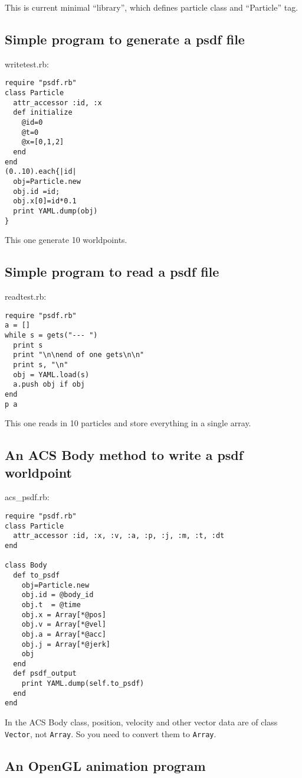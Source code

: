 \documentclass[12pt]{article}
\begin{document}
This is current minimal ``library'', which defines particle class and
``Particle'' tag.

\subsection{Simple program to generate a psdf file}

writetest.rb:
\begin{verbatim}
require "psdf.rb"
class Particle
  attr_accessor :id, :x   
  def initialize
    @id=0
    @t=0
    @x=[0,1,2]
  end
end
(0..10).each{|id|
  obj=Particle.new
  obj.id =id;
  obj.x[0]=id*0.1
  print YAML.dump(obj)
}
\end{verbatim}

This one generate 10 worldpoints.

\subsection{Simple program to read a psdf file}

readtest.rb:
\begin{verbatim}
require "psdf.rb"
a = []
while s = gets("--- ")
  print s
  print "\n\nend of one gets\n\n"
  print s, "\n"
  obj = YAML.load(s) 
  a.push obj if obj
end
p a
\end{verbatim}

This one reads in 10 particles and store everything in a single array.

\subsection{An ACS Body method to write a psdf worldpoint}

acs\_psdf.rb:
\begin{verbatim}
require "psdf.rb"
class Particle
  attr_accessor :id, :x, :v, :a, :p, :j, :m, :t, :dt
end

class Body
  def to_psdf
    obj=Particle.new
    obj.id = @body_id
    obj.t  = @time
    obj.x = Array[*@pos]
    obj.v = Array[*@vel]
    obj.a = Array[*@acc]
    obj.j = Array[*@jerk]
    obj
  end
  def psdf_output
    print YAML.dump(self.to_psdf)
  end
end
\end{verbatim}

In the ACS Body class, position, velocity and other vector data are of
class {\tt Vector}, not {\tt Array}. So you need to convert them to
{\tt Array}.

\subsection{An OpenGL animation program}
\end{document}
